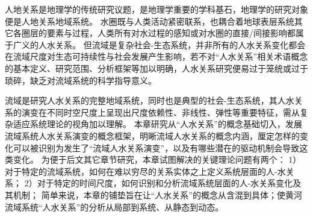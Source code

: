 
人地关系是地理学的传统研究议题，是地理学重要的学科基石，地理学的研究对象便是人地关系地域系统\cite{zhang2022c}。
水圈既与人类活动紧密联系，也耦合着地球表层系统其它各圈层的要素与过程，人类所有对水过程的感知或对水圈的直接/间接影响都属于广义的人水关系\cite{falkenmark2021}。
但流域是复杂社会-生态系统，并非所有的人水关系变化都会在流域尺度对生态可持续性与社会发展产生影响，若不对“人水关系”相关术语概念的基本定义、研究范围、分析框架等加以明确，人水关系研究便易过于笼统或过于琐碎，缺乏对流域系统的科学指导意义。

流域是研究人水关系的完整地域系统，同时也是典型的社会-生态系统\cite{huggins2022}，其人水关系的演变在不同时空尺度上呈现出尺度依赖性、非线性、弹性等重要特征\cite{reyers2018}，需从复杂适应系统理论的视角加以理解\cite{wang2019d}。
本章研究从“人水关系”的概念基础切入，发展流域系统人水关系演变的概念框架，明晰流域人水关系的概念内涵，厘定怎样的变化可以被识别为发生了“流域人水关系演变”，以及有哪些潜在的驱动机制会导致这类变化。
为便于后文其它章节研究，本章试图解决的关键理论问题有两个：
1）对于特定的流域系统，如何在难以穷尽的关系实体之上定义系统层面的人-水关系；
2）对于特定的时间尺度，如何识别和分析流域系统层面的人-水关系变化及其机制；
简单来说，本章的铺垫旨在让“人水关系”的概念从含混到具体；使黄河流域系统“人水关系”的分析从局部到系统、从静态到动态。
